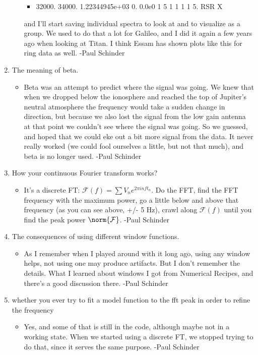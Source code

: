 \documentclass[crop=false,class=book]{standalone}
\begin{document}
\begin{enumerate}
\begin{itemize}
        \begin{itemize}
            \item 32000. 34000. 1.22344945e+03 0. 0.0e0 1 5 1 1 1 1 5. RSR X
        \end{itemize}
        and I’ll start saving individual spectra to look at and to visualize as a group.  We used to do that a lot for Galileo, and I did it again a few years ago when looking at Titan.  I think Essam has shown plots like this for ring data as well. -Paul Schinder
    \end{itemize}
    \item The meaning of beta.
    \begin{itemize}
        \item Beta was an attempt to predict where the signal was going.  We knew that when we dropped below the ionosphere and reached the top of Jupiter’s neutral atmosphere the frequency would take a sudden change in direction, but because we also lost the signal from the low gain antenna at that point we couldn’t see where the signal was going.  So we guessed, and hoped that we could eke out a bit more signal from the data.  It never really worked (we could fool ourselves a little, but not that much), and beta is no longer used. -Paul Schinder
    \end{itemize}
    \item How your continuous Fourier transform works?
    \begin{itemize}
        \item It’s a discrete FT: $\mathcal{F}(f) = \sum V_n e^{2\pi i n f t_n}$. Do the FFT, find the FFT frequency with the maximum power, go a little below and above that frequency (as you can see above, +/- 5 Hz), crawl along $\mathcal{F}(f)$ until you find the peak power $\norm{\mathcal{F}}$. -Paul Schinder
    \end{itemize}
    \item The consequences of using different window functions.
    \begin{itemize}
        \item As I remember when I played around with it long ago, using any window helps, not using one may produce artifacts.  But I don’t remember the details.  What I learned about windows I got from Numerical Recipes, and there’s a good discussion there. -Paul Schinder
    \end{itemize}
    \item whether you ever try to fit a model function to the fft peak in order to refine the frequency
    \begin{itemize}
        \item Yes, and some of that is still in the code, although maybe not in a working state.  When we started using a discrete FT, we stopped trying to do that, since it serves the same purpose. -Paul Schinder
    \end{itemize}
\end{enumerate}
\end{document}
